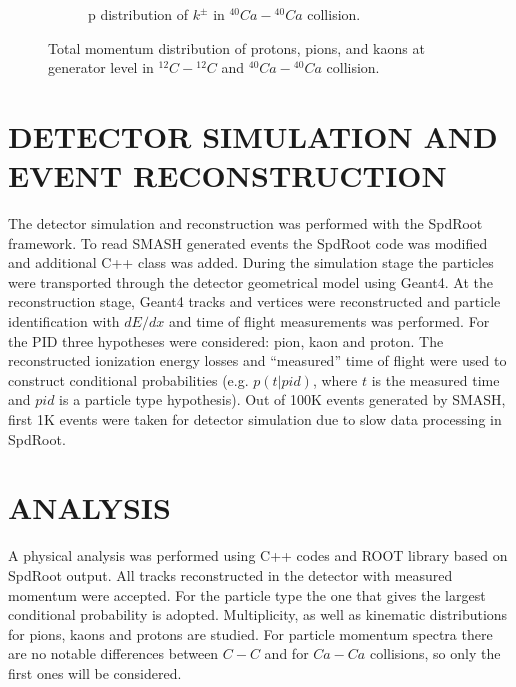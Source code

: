 \documentclass[12pt]{article}
\begin{document}
\begin{figure}[h]
\begin{subfigure}[h]{0.49\textwidth}
\caption{p distribution of $k^{\pm}$ in $^{40}Ca-{^{40}Ca}$ collision.}
\label{Generator - Total momentum distribution of kaons Ca40.}
\end{subfigure}
\caption{Total momentum distribution of protons, pions, and kaons at generator level in $^{12}C-{^{12}C}$ and $^{40}Ca-{^{40}Ca}$ collision.}
\label{gen-p}
\end{figure}

\clearpage


\section{DETECTOR SIMULATION AND EVENT RECONSTRUCTION}
The detector simulation and reconstruction was performed with
the SpdRoot framework. To read SMASH generated events the
SpdRoot code was modified and additional C++ class was added.
During the simulation stage the particles
were transported through the detector geometrical model using
Geant4. At the reconstruction stage, Geant4 tracks and vertices
were reconstructed and particle identification with $dE/dx$ and
time of flight measurements was performed. For the PID three
hypotheses were considered: pion, kaon and proton.
The reconstructed ionization energy losses and ``measured'' time of flight
were used to construct conditional probabilities (e.g. $p(t|pid)$,
where $t$ is the measured time and $pid$ is a particle type hypothesis). Out of 100K events generated by SMASH, first 1K events were taken for
detector simulation due to slow data processing in SpdRoot.

\section{ANALYSIS}
A physical analysis was performed using C++ codes and ROOT library
based on SpdRoot output. All tracks reconstructed in the detector with measured 
momentum were accepted. For the particle type the one that
gives the largest conditional probability is adopted. Multiplicity, as well as kinematic distributions for
pions, kaons and protons are studied.
For particle momentum spectra there are no notable differences
between $C-C$ and for $Ca-Ca$ collisions, so only the first ones
will be considered.
\end{document}
